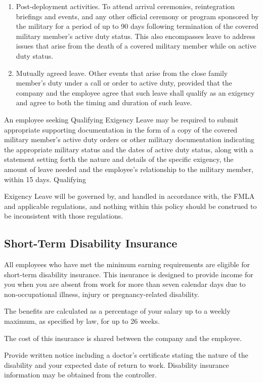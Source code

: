 \begin{enumerate}
	\item Post-deployment activities. To attend arrival 	ceremonies, reintegration briefings and events, 	and any other official ceremony or program 	sponsored by the military for a period of up to 90 	days following termination of the covered military 	member’s active duty status. This also 	encompasses leave to address issues that arise 	from the death of a covered military member 	while on active duty status.
	
	\item Mutually agreed leave. Other events that arise 	from the close family member’s duty under a call 	or order to active duty, provided that the 	company and the employee agree that such 	leave shall qualify as an exigency and agree to 	both the timing and duration of such leave. \end{enumerate}

An employee seeking Qualifying Exigency Leave may be required to submit appropriate supporting documentation in the form of a copy of the covered military member’s active duty orders or other military documentation indicating the appropriate military status and the dates of active duty status, along with a statement setting forth the nature and details of the specific exigency, the amount of leave needed and the employee's relationship to the military member, within 15 days. Qualifying

Exigency Leave will be governed by, and handled in accordance with, the FMLA and applicable regulations, and nothing within this policy should be construed to be inconsistent with those regulations.

\subsection{Short-Term Disability Insurance}

All employees who have met the minimum earning requirements are eligible for short-term disability insurance. This insurance is designed to provide income for you when you are absent from work for more than seven calendar days due to non-occupational illness, injury or pregnancy-related disability.

The benefits are calculated as a percentage of your salary up to a weekly maximum, as specified by law, for up to 26 weeks.

The cost of this insurance is shared between the company and the employee.

Provide written notice including a doctor's certificate stating the nature of the disability and your expected date of return to work. Disability insurance information may be obtained from the controller.

